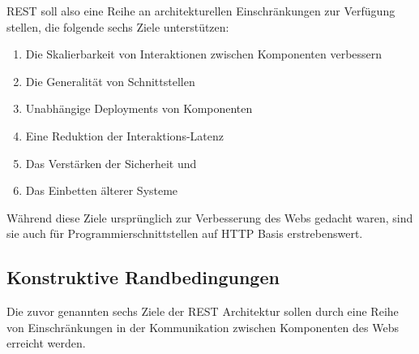 REST soll also eine Reihe an architekturellen Einschränkungen zur Verfügung stellen, die folgende sechs Ziele unterstützen:

\begin{enumerate}
    \item Die Skalierbarkeit von Interaktionen zwischen Komponenten verbessern
    \item Die Generalität von Schnittstellen
    \item Unabhängige Deployments von Komponenten
    \item Eine Reduktion der Interaktions-Latenz
    \item Das Verstärken der Sicherheit und
    \item Das Einbetten älterer Systeme
\end{enumerate}

Während diese Ziele ursprünglich zur Verbesserung des Webs gedacht waren, sind sie auch für Programmierschnittstellen auf HTTP Basis erstrebenswert.

\subsection{Konstruktive Randbedingungen}\label{subsection:konstruktive-randbedingungen}

Die zuvor genannten sechs Ziele der REST Architektur sollen durch eine Reihe von Einschränkungen in der Kommunikation zwischen Komponenten des Webs erreicht werden.


